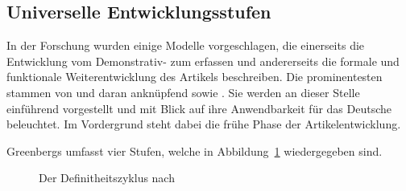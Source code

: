 \subsection{Universelle Entwicklungsstufen}\label{sec:stufen}

In der Forschung wurden einige Modelle vorgeschlagen, die einerseits die Entwicklung vom Demonstrativ-  zum  erfassen und andererseits die formale und funktionale Weiterentwicklung des Artikels beschreiben. Die prominentesten stammen von \textcite{Greenberg1978} und daran anknüpfend \textcite{Lehmann2015} sowie \textcite{Schmuck2014}. Sie werden an dieser Stelle einführend vorgestellt und mit Blick auf ihre Anwendbarkeit für das Deutsche beleuchtet. Im Vordergrund steht dabei die frühe Phase der Artikelentwicklung. 
%

Greenbergs    \parencite[61]{Greenberg1978} umfasst vier Stufen, welche in Abbildung~\ref{abb:greenberg} \parencite[entnommen aus][525]{deMulder2011} wiedergegeben sind.

\begin{figure}
\caption {Der Definitheitszyklus   nach \textcite{Greenberg1978}\label{abb:greenberg}}
\end{figure}


